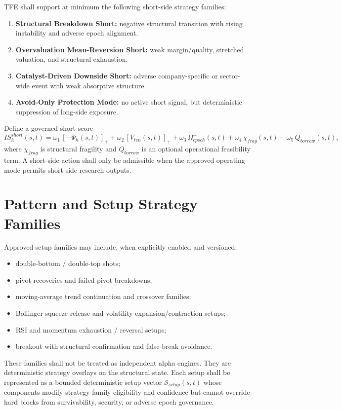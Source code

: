 TFE shall support at minimum the following short-side strategy families:
\begin{enumerate}[leftmargin=1.2cm]
    \item \textbf{Structural Breakdown Short:} negative structural transition with rising instability and adverse epoch alignment.
    \item \textbf{Overvaluation Mean-Reversion Short:} weak margin/quality, stretched valuation, and structural exhaustion.
    \item \textbf{Catalyst-Driven Downside Short:} adverse company-specific or sector-wide event with weak absorptive structure.
    \item \textbf{Avoid-Only Protection Mode:} no active short signal, but deterministic suppression of long-side exposure.
\end{enumerate}
Define a governed short score
\[
IS_h^{short}(s,t)=\omega_1\,[-\Psi_h(s,t)]_{+}+\omega_2\,[V_{ten}(s,t)]_{+}+\omega_3\,\Omega_{epoch}^{-}(s,t)+\omega_4\,\chi_{frag}(s,t)-\omega_5\,Q_{borrow}(s,t),
\]
where $\chi_{frag}$ is structural fragility and $Q_{borrow}$ is an optional operational feasibility term. A short-side action shall only be admissible when the approved operating mode permits short-side research outputs.

\section{Pattern and Setup Strategy Families}

Approved setup families may include, when explicitly enabled and versioned:
\begin{itemize}
    \item double-bottom / double-top shots;
    \item pivot recoveries and failed-pivot breakdowns;
    \item moving-average trend continuation and crossover families;
    \item Bollinger squeeze-release and volatility expansion/contraction setups;
    \item RSI and momentum exhaustion / reversal setups;
    \item breakout with structural confirmation and false-break avoidance.
\end{itemize}
These families shall not be treated as independent alpha engines. They are deterministic strategy overlays on the structural state. Each setup shall be represented as a bounded deterministic setup vector $\mathcal{S}_{setup}(s,t)$ whose components modify strategy-family eligibility and confidence but cannot override hard blocks from survivability, security, or adverse epoch governance.

